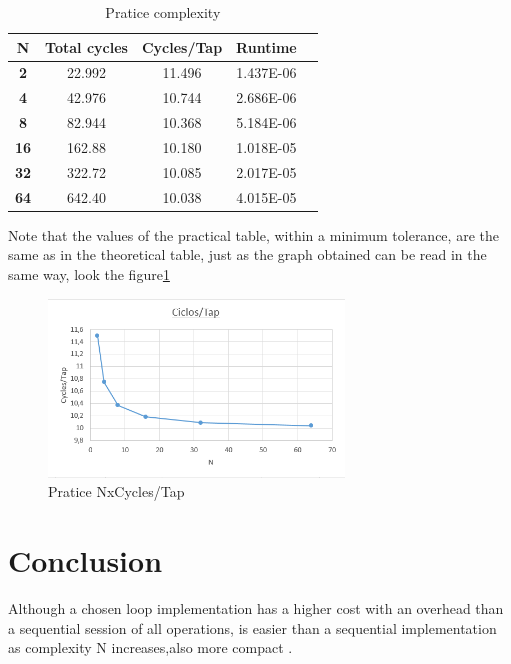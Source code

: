 \documentclass{article}
\begin{document}
\begin{table}[!ht]
\begin{center}
\caption{Pratice complexity}
\begin{tabular}{|c|c|c|c|c|}
\hline
\textbf{N} & \textbf{Total cycles} & \textbf{Cycles/Tap} & \textbf{Runtime} \\
\hline
\textbf{2}  & 22.992  & 11.496  & 1.437E-06  \\
\textbf{4}  & 42.976  & 10.744  & 2.686E-06  \\
\textbf{8}  & 82.944  & 10.368  & 5.184E-06  \\
\textbf{16} & 162.88  & 10.180  & 1.018E-05 \\
\textbf{32} & 322.72  & 10.085  & 2.017E-05 \\
\textbf{64} & 642.40  & 10.038  & 4.015E-05 \\
\hline
\end{tabular}
\label{tab:P_C}
\end{center}
\end{table}


Note that the values of the practical table, within a minimum tolerance, are the same as in the theoretical table, just as the graph obtained can be read in the same way, look the figure\ref{fig:P_NxTap}


\begin{figure}[ht]
\centering
\includegraphics[width=0.7\textwidth]
{./figuras/P_NxTAP.PNG}
\caption{Pratice NxCycles/Tap}
\label{fig:P_NxTap}
\end{figure}


\section{Conclusion}
Although a chosen loop implementation has a higher cost with an overhead than a sequential session of all operations, is easier than a sequential implementation as complexity N increases,also more compact .
\end{document}
